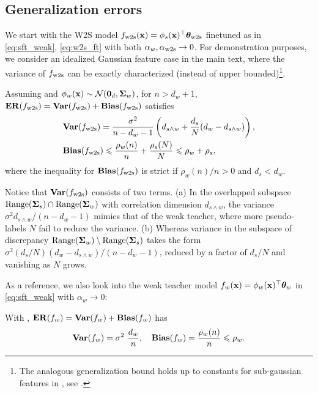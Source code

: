 \subsection{Generalization errors}\label{sec:generalization_errors}
We start with the W2S model $f_{\mathrm{w2s}}(\mathbf{x}) = \phi_s(\mathbf{x})^\top \boldsymbol{\theta}_{\mathrm{w2s}}$ finetuned as in \eqref{eq:sft_weak}, \eqref{eq:w2s_ft} with both $\alpha_w, \alpha_{\mathrm{w2s}} \to 0$. For demonstration purposes, we consider an idealized Gaussian feature case in the main text, where the variance of $f_{\mathrm{w2s}}$ can be exactly characterized (instead of upper bounded)\footnote{\label{fn:gaussian_features}
    The analogous generalization bound holds up to constants for sub-gaussian features in , see .
}. 
\begin{theorem}\label{thm:w2s_ft}
    Assuming  and $\phi_w(\mathbf{x}) \sim \mathcal{N}(\textbf0_d, \boldsymbol{\Sigma}_w)$, for $n > d_w + 1$, $\mathbf{ER}(f_{\mathrm{w2s}}) = \mathbf{Var}(f_{\mathrm{w2s}}) + \mathbf{Bias}(f_{\mathrm{w2s}})$ satisfies
    \begin{align*}
        &\mathbf{Var}(f_{\mathrm{w2s}}) = \frac{\sigma^2}{n-d_w-1} \left(d_{s \wedge w} + \frac{d_s}{N} (d_w-d_{s \wedge w})\right), \\
        &\mathbf{Bias}(f_{\mathrm{w2s}}) \leqslant \frac{\rho_w(n)}{n} + \frac{\rho_s(N)}{N} \leqslant \rho_w + \rho_s,
    \end{align*}
    where the inequality for $\mathbf{Bias}(f_{\mathrm{w2s}})$ is strict if ${\rho_w(n)}/{n} > 0$ and $d_s < d_w$.
\end{theorem}

\begin{remark}\label{rmk:variance_decomposition}
    Notice that $\mathbf{Var}(f_{\mathrm{w2s}})$ consists of two terms.
    (a) In the overlapped subspace $\mathop{\mathrm{Range}}(\boldsymbol{\Sigma}_s) \cap \mathop{\mathrm{Range}}(\boldsymbol{\Sigma}_w)$ with correlation dimension $d_{s \wedge w}$, the variance $\sigma^2 d_{s \wedge w} / (n-d_w-1)$ mimics that of the weak teacher, where more pseudo-labels $N$ fail to reduce the variance.
    (b) Whereas variance in the subspace of discrepancy $\mathop{\mathrm{Range}}(\boldsymbol{\Sigma}_w) \setminus \mathop{\mathrm{Range}}(\boldsymbol{\Sigma}_s)$ takes the form $\sigma^2 (d_s / N)(d_w - d_{s \wedge w}) / (n-d_w-1)$, reduced by a factor of $d_s/N$ and vanishing as $N$ grows.
\end{remark}

As a reference, we also look into the weak teacher model $f_w(\mathbf{x}) = \phi_w(\mathbf{x})^\top \boldsymbol{\theta}_w$ in \eqref{eq:sft_weak} with $\alpha_w \to 0$:
\begin{proposition}\label{pro:sft_weak}
    With , $\mathbf{ER}(f_w) = \mathbf{Var}(f_w) + \mathbf{Bias}(f_w)$ has
    \begin{align*}
        \mathbf{Var}(f_w) = \sigma^2\ \frac{d_w}{n}, \quad 
        \mathbf{Bias}(f_w) = \frac{\rho_w(n)}{n} \leqslant \rho_w.
    \end{align*}
\end{proposition}


